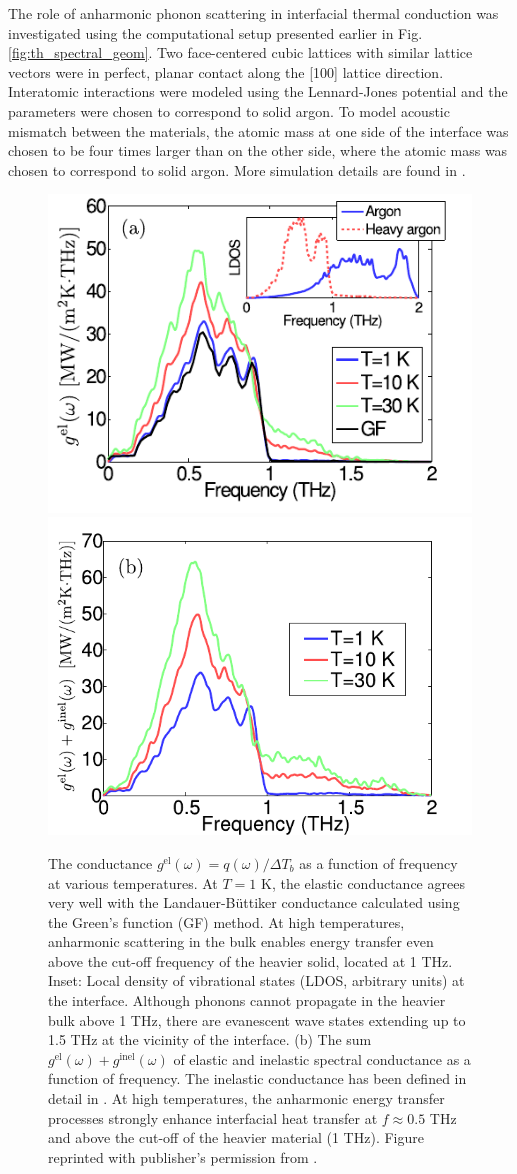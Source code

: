 The role of anharmonic phonon scattering in interfacial thermal conduction was investigated using the computational setup presented earlier in Fig. \ref{fig:th_spectral_geom}. Two face-centered cubic lattices with similar lattice vectors were in perfect, planar contact along the [100] lattice direction. Interatomic interactions were modeled using the Lennard-Jones potential \cite{allentildesley} and the parameters were chosen to correspond to solid argon. To model acoustic mismatch between the materials, the atomic mass at one side of the interface was chosen to be four times larger than on the other side, where the atomic mass was chosen to correspond to solid argon. More simulation details are found in .

\begin{figure}[tb]
 \begin{center}
  \includegraphics[width=.49\columnwidth]{pics/nemd_fig4a.pdf}
  \includegraphics[width=.49\columnwidth]{pics/nemd_fig4b.pdf}
  \caption{The conductance $g^{\textrm{el}}(\omega)=q(\omega)/\Delta T_b$ as a function of frequency at various temperatures. At $T=1$ K, the elastic conductance agrees very well with the Landauer-B\"uttiker conductance calculated using the Green's function (GF) method. At high temperatures, anharmonic scattering in the bulk enables energy transfer even above the cut-off frequency of the heavier solid, located at 1 THz. Inset: Local density of vibrational states (LDOS, arbitrary units) at the interface. Although phonons cannot propagate in the heavier bulk above 1 THz, there are evanescent wave states extending up to 1.5 THz at the vicinity of the interface. (b) The sum $g^{\textrm{el}}(\omega)+ g^{\textrm{inel}}(\omega)$ of elastic and inelastic spectral conductance as a function of frequency. The inelastic conductance has been defined in detail in . At high temperatures, the anharmonic energy transfer processes strongly enhance interfacial heat transfer at $f\approx 0.5$ THz and above the cut-off of the heavier material (1 THz). Figure reprinted with publisher's permission from .} 

\end{center}
\end{figure}
